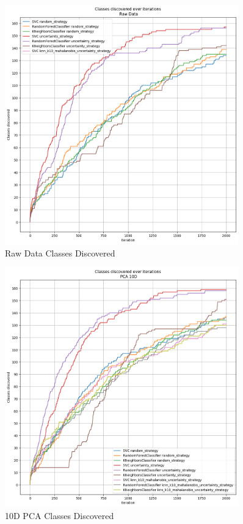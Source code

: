 
\newpage
\onecolumn
\centering
{}
\begin{figure}[htbp]
\centering
\includegraphics[width=0.9\textwidth]{resources/images/rev2_classes_discovered_raw_data.png}
\caption{Raw Data Classes Discovered}
\label{fig:classes_discovered_begin}
\end{figure}

\begin{figure}[htbp]
\centering
\includegraphics[width=0.9\textwidth]{resources/images/rev2_classes_discovered_10d.png}
\caption{10D PCA Classes Discovered }
\end{figure}

